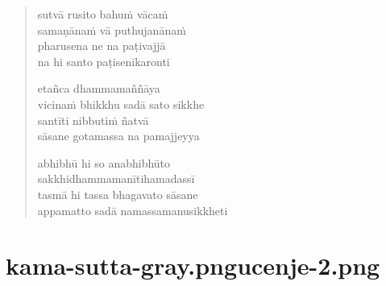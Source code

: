\begin{verse}
sutvā rusito bahuṁ vācaṁ\\
samaṇānaṁ vā puthujanānaṁ\\
pharusena ne na paṭivajjā\\
na hi santo paṭisenikaronti

etañca dhammamaññāya\\
vicinaṁ bhikkhu sadā sato sikkhe\\
santīti nibbutiṁ ñatvā\\
sāsane gotamassa na pamajjeyya

abhibhū hi so anabhibhūto\\
sakkhidhammamanītihamadassī\\
tasmā hi tassa bhagavato sāsane\\
appamatto sadā namassamanusikkheti

\end{verse}


\chapter[Tuvaṭaka Sutta]{{kama-sutta-gray.png}{ucenje-2.png}}


